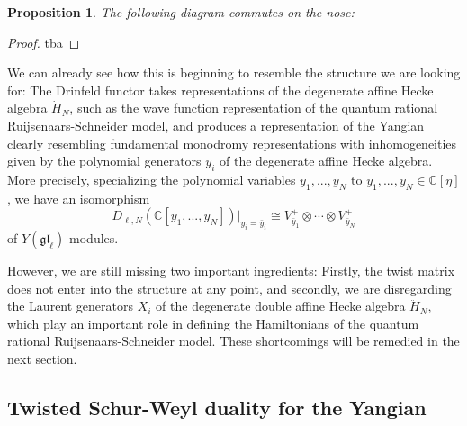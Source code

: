 \documentclass[11pt]{report}
\newtheorem{prop}[theorem]{Proposition}
\theoremstyle{definition}
\theoremstyle{remark}
\theoremstyle{remark}
\newcommand{\C}{\mathbb{C}}
\begin{document}
\begin{prop}
The following diagram commutes on the nose:
\begin{center}
\end{center}
\end{prop}

\begin{proof}
tba
\end{proof}

We can already see how this is beginning to resemble the structure we are looking for: The Drinfeld functor takes representations of the degenerate affine Hecke algebra $\dot H_N$, such as the wave function representation of the quantum rational Ruijsenaars-Schneider model, and produces a representation of the Yangian clearly resembling fundamental monodromy representations with inhomogeneities given by the polynomial generators $y_i$ of the degenerate affine Hecke algebra. More precisely, specializing the polynomial variables $y_1,...,y_N$ to $\bar y_1,...,\bar y_N \in \C[\eta]$, we have an isomorphism
\begin{equation*}
D_{\ell,N}(\C[y_1,...,y_N])|_{y_i=\bar y_i} \cong V_{\bar y_1}^+ \otimes \cdots \otimes V_{\bar y_N}^+
\end{equation*}
of $Y(\mathfrak{gl}_\ell)$-modules.

However, we are still missing two important ingredients: Firstly, the twist matrix does not enter into the structure at any point, and secondly, we are disregarding the Laurent generators $X_i$ of the degenerate double affine Hecke algebra $\ddot H_N$, which play an important role in defining the Hamiltonians of the quantum rational Ruijsenaars-Schneider model. These shortcomings will be remedied in the next section.

\subsection{Twisted Schur-Weyl duality for the Yangian}
\end{document}
